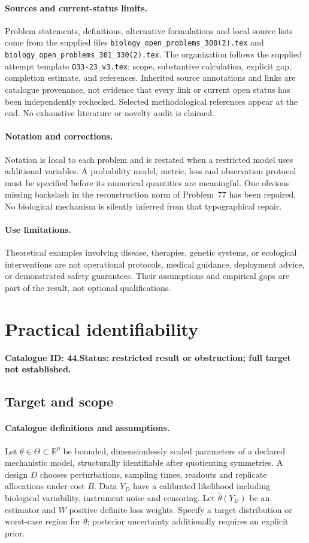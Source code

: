 \documentclass[11pt]{article}
\newcommand{\R}{\mathbb R}
\providecommand{\R}{\mathbb R}
\begin{document}
\paragraph{Sources and current-status limits.}
Problem statements, definitions, alternative formulations and local source lists
come from the supplied files
\texttt{biology\_open\_problems\_300(2).tex} and
\texttt{biology\_open\_problems\_301\_330(2).tex}.
The organization follows the supplied attempt template
\texttt{O33-23\_v3.tex}: scope, substantive calculation, explicit gap,
completion estimate, and references. Inherited source annotations and links are
catalogue provenance, not evidence that every link or current open status has
been independently rechecked. Selected methodological references appear at the
end. No exhaustive literature or novelty audit is claimed.

\paragraph{Notation and corrections.}
Notation is local to each problem and is restated when a restricted model uses
additional variables. A probability model, metric, loss and observation protocol
must be specified before its numerical quantities are meaningful. One obvious
missing backslash in the reconstruction norm of Problem~77 has been repaired.
No biological mechanism is silently inferred from that typographical repair.

\paragraph{Use limitations.}
Theoretical examples involving disease, therapies, genetic systems, or ecological
interventions are not operational protocols, medical guidance, deployment advice,
or demonstrated safety guarantees. Their assumptions and empirical gaps are part
of the result, not optional qualifications.

\setcounter{section}{43}
\section{Practical identifiability}
\label{prob:044}
\noindent\textbf{Catalogue ID: 44.}\quad \textbf{Status: restricted result or obstruction; full target not established.}
\subsection{Target and scope}
\paragraph{Catalogue definitions and assumptions.}
Let $\theta\in\Theta\subset\R^p$ be bounded, dimensionlessly scaled parameters of a declared mechanistic model, structurally identifiable after quotienting symmetries. A design $D$ chooses perturbations, sampling times, readouts and replicate allocations under cost $B$. Data $Y_D$ have a calibrated likelihood including biological variability, instrument noise and censoring. Let $\widehat\theta(Y_D)$ be an estimator and $W$ positive definite loss weights. Specify a target distribution or worst-case region for $\theta$; posterior uncertainty additionally requires an explicit prior.
\end{document}
